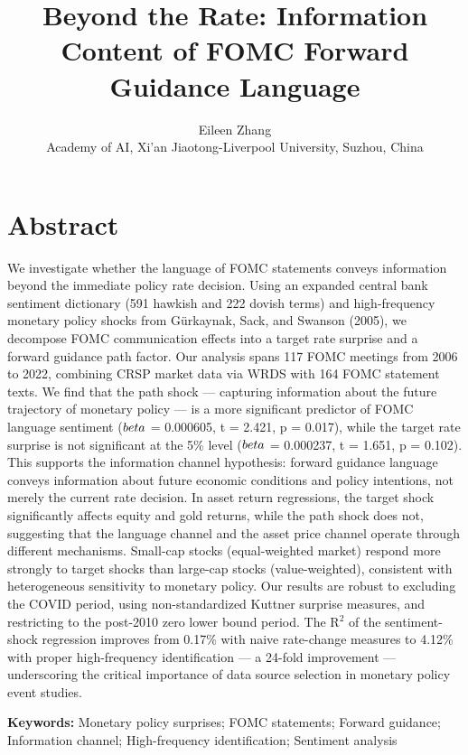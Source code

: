\documentclass[12pt]{article}
\title{\textbf{Beyond the Rate: Information Content of FOMC Forward Guidance Language}}
\author{Eileen Zhang\\[4pt]
\small Academy of AI, Xi'an Jiaotong-Liverpool University, Suzhou, China}
\date{}
\begin{document}
\maketitle


\section{Abstract}

We investigate whether the language of FOMC statements conveys information beyond the immediate policy rate decision. Using an expanded central bank sentiment dictionary (591 hawkish and 222 dovish terms) and high-frequency monetary policy shocks from G\"urkaynak, Sack, and Swanson (2005), we decompose FOMC communication effects into a target rate surprise and a forward guidance path factor. Our analysis spans 117 FOMC meetings from 2006 to 2022, combining CRSP market data via WRDS with 164 FOMC statement texts. We find that the path shock --- capturing information about the future trajectory of monetary policy --- is a more significant predictor of FOMC language sentiment ($\\beta$ = 0.000605, t = 2.421, p = 0.017), while the target rate surprise is not significant at the 5\% level ($\\beta$ = 0.000237, t = 1.651, p = 0.102). This supports the information channel hypothesis: forward guidance language conveys information about future economic conditions and policy intentions, not merely the current rate decision. In asset return regressions, the target shock significantly affects equity and gold returns, while the path shock does not, suggesting that the language channel and the asset price channel operate through different mechanisms. Small-cap stocks (equal-weighted market) respond more strongly to target shocks than large-cap stocks (value-weighted), consistent with heterogeneous sensitivity to monetary policy. Our results are robust to excluding the COVID period, using non-standardized Kuttner surprise measures, and restricting to the post-2010 zero lower bound period. The R$^2$ of the sentiment-shock regression improves from 0.17\% with naive rate-change measures to 4.12\% with proper high-frequency identification --- a 24-fold improvement --- underscoring the critical importance of data source selection in monetary policy event studies.

\textbf{Keywords:} Monetary policy surprises; FOMC statements; Forward guidance; Information channel; High-frequency identification; Sentiment analysis
\end{document}

